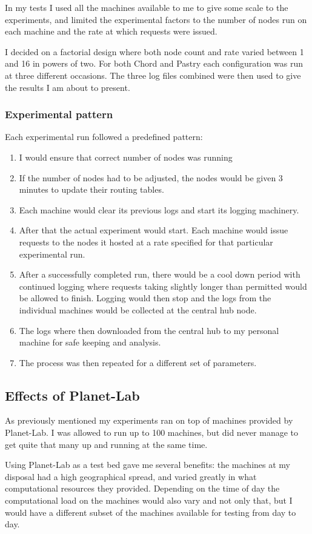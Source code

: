 In my tests I used all the machines available to me to give some scale to the experiments, and limited the experimental factors to the number of nodes run on each machine and the rate at which requests were issued.

I decided on a factorial design where both node count and rate varied between 1 and 16 in powers of two. For both Chord and Pastry each configuration was run at three different occasions. The three log files combined were then used to give the results I am about to present.

\subsubsection{Experimental pattern}
Each experimental run followed a predefined pattern:
\begin{enumerate}
\item I would ensure that correct number of nodes was running
\item If the number of nodes had to be adjusted, the nodes would be given 3 minutes to update their routing tables.
\item Each machine would clear its previous logs and start its logging machinery.
\item After that the actual experiment would start. Each machine would issue requests to the nodes it hosted at a rate specified for that particular experimental run.
\item After a successfully completed run, there would be a cool down period with continued logging where requests taking slightly longer than permitted would be allowed to finish. Logging would then stop and the logs from the individual machines would be collected at the central hub node.
\item The logs where then downloaded from the central hub to my personal machine for safe keeping and analysis.
\item The process was then repeated for a different set of parameters.
\end{enumerate}

\subsection{Effects of Planet-Lab}
As previously mentioned my experiments ran on top of machines provided by Planet-Lab. I was allowed to run up to 100 machines, but did never manage to get quite that many up and running at the same time.

Using Planet-Lab as a test bed gave me several benefits: the machines at my disposal had a high geographical spread, and varied greatly in what computational resources they provided. Depending on the time of day the computational load on the machines would also vary and not only that, but I would have a different subset of the machines available for testing from day to day.

